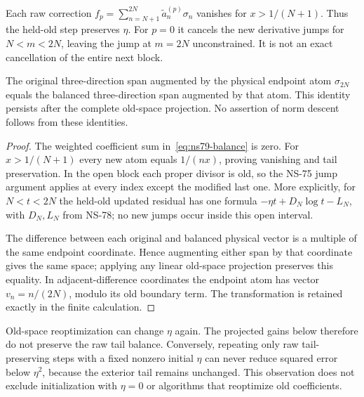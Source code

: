 \begin{proposition}
\label{prop:ns79-balance}
Each raw correction $f_p=\sum_{n=N+1}^{2N}\widetilde a_n^{(p)}\sigma_n$
vanishes for $x>1/(N+1)$. Thus the held-old step preserves $\eta$.
For $p=0$ it cancels the new derivative jumps for $N<m<2N$, leaving
the jump at $m=2N$ unconstrained. It is not an exact cancellation of
the entire next block.

The original three-direction span augmented by the physical endpoint
atom $\sigma_{2N}$ equals the balanced three-direction span augmented
by that atom. This identity persists after the complete old-space
projection. No assertion of norm descent follows from these identities.
\end{proposition}
\begin{proof}
The weighted coefficient sum in~\eqref{eq:ns79-balance} is zero.
For $x>1/(N+1)$ every new atom equals $1/(nx)$, proving vanishing
and tail preservation. In the open block each proper divisor is old,
so the NS-75 jump argument applies at every index except the modified
last one. More explicitly, for $N<t<2N$ the held-old updated residual
has one formula $-\eta t+D_N\log t-L_N$, with $D_N,L_N$ from NS-78;
no new jumps occur inside this open interval.

The difference between each original and balanced physical vector is
a multiple of the same endpoint coordinate. Hence augmenting either
span by that coordinate gives the same space; applying any linear
old-space projection preserves this equality. In adjacent-difference
coordinates the endpoint atom has vector $v_n=n/(2N)$, modulo its
old boundary term. The transformation is retained exactly in the
finite calculation.
\end{proof}

Old-space reoptimization can change $\eta$ again. The projected gains
below therefore do not preserve the raw tail balance. Conversely,
repeating only raw tail-preserving steps with a fixed nonzero initial
$\eta$ can never reduce squared error below $\eta^2$, because the
exterior tail remains unchanged. This observation does not exclude
initialization with $\eta=0$ or algorithms that reoptimize old coefficients.

